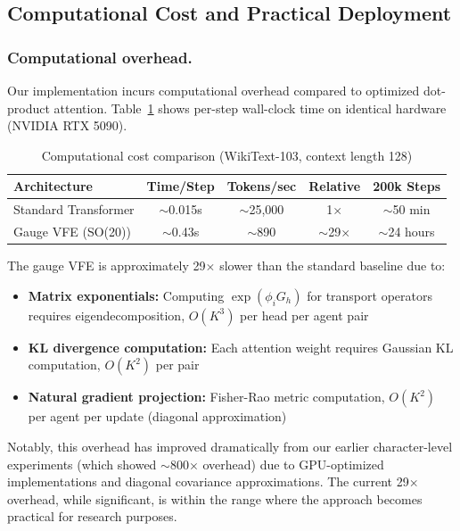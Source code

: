 \documentclass[twoside,11pt]{article}
\begin{document}
\subsection{Computational Cost and Practical Deployment}
\label{sec:computational_cost}

\subsubsection{Computational overhead.}

Our implementation incurs computational overhead compared to optimized dot-product attention. Table~\ref{tab:compute_cost} shows per-step wall-clock time on identical hardware (NVIDIA RTX 5090).

\begin{table}[h]
\centering
\caption{Computational cost comparison (WikiText-103, context length 128)}
\label{tab:compute_cost}
\begin{tabular}{lcccc}
\toprule
\textbf{Architecture} & \textbf{Time/Step} & \textbf{Tokens/sec} & \textbf{Relative} & \textbf{200k Steps} \\
\midrule
Standard Transformer & $\sim$0.015s & $\sim$25,000 & 1$\times$ & $\sim$50 min \\
Gauge VFE (SO(20)) & $\sim$0.43s & $\sim$890 & $\sim$29$\times$ & $\sim$24 hours \\
\bottomrule
\end{tabular}
\end{table}

The gauge VFE is approximately 29$\times$ slower than the standard baseline due to:

\begin{itemize}
\item \textbf{Matrix exponentials:} Computing $\exp(\phi_i G_h)$ for transport operators requires eigendecomposition, $O(K^3)$ per head per agent pair

\item \textbf{KL divergence computation:} Each attention weight requires Gaussian KL computation, $O(K^2)$ per pair

\item \textbf{Natural gradient projection:} Fisher-Rao metric computation, $O(K^2)$ per agent per update (diagonal approximation)
\end{itemize}

Notably, this overhead has improved dramatically from our earlier character-level experiments (which showed $\sim$800$\times$ overhead) due to GPU-optimized implementations and diagonal covariance approximations. The current 29$\times$ overhead, while significant, is within the range where the approach becomes practical for research purposes.
\end{document}
